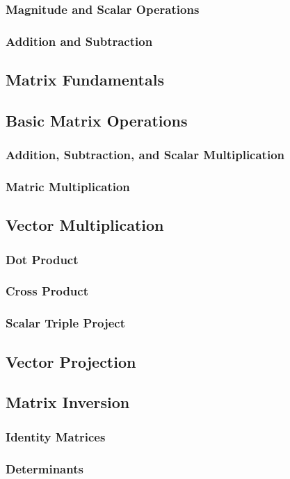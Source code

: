 \documentclass[a4paper,10pt]{article}
\begin{document}
\subsubsection{Magnitude and Scalar Operations}
\subsubsection{Addition and Subtraction}
\subsection{Matrix Fundamentals}
\subsection{Basic Matrix Operations}
\subsubsection{Addition, Subtraction, and Scalar Multiplication}
\subsubsection{Matric Multiplication}
\subsection{Vector Multiplication}
\subsubsection{Dot Product}
\subsubsection{Cross Product}
\subsubsection{Scalar Triple Project}
\subsection{Vector Projection}
\subsection{Matrix Inversion}
\subsubsection{Identity Matrices}
\subsubsection{Determinants}
\end{document}
